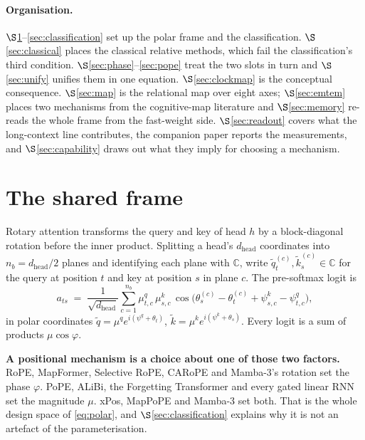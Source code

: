 \documentclass[11pt]{article}
\newcommand{\C}{\mathbb{C}}
\newcommand{\hd}{d_{\mathrm{head}}}
\newcommand{\nb}{n_b}
\begin{document}
\paragraph{Organisation.} $\S$\ref{sec:frame}--\ref{sec:classification} set up the
polar frame and the classification. $\S$\ref{sec:classical} places the classical
relative methods, which fail the classification's third condition.
$\S$\ref{sec:phase}--\ref{sec:pope} treat the two slots in turn and
$\S$\ref{sec:unify} unifies them in one equation. $\S$\ref{sec:clockmap} is the
conceptual consequence. $\S$\ref{sec:map} is the relational map over eight axes;
$\S$\ref{sec:emtem} places two mechanisms from the cognitive-map literature and
$\S$\ref{sec:memory} re-reads the whole frame from the fast-weight side.
$\S$\ref{sec:readout} covers what the long-context line contributes,
the companion paper reports the measurements, and $\S$\ref{sec:capability} draws
out what they imply for choosing a mechanism.


\section{The shared frame}
\label{sec:frame}

Rotary attention transforms the query and key of head $h$ by a block-diagonal
rotation before the inner product. Splitting a head's $\hd$ coordinates into
$\nb = \hd/2$ planes and identifying each plane with $\C$, write
$\tilde q_t^{(c)}, \tilde k_s^{(c)} \in \C$ for the query at position $t$ and key at
position $s$ in plane $c$. The pre-softmax logit is
\begin{equation}
  \label{eq:polar}
  a_{ts} \;=\; \frac{1}{\sqrt{\hd}}\sum_{c=1}^{\nb}
    \mu^q_{t,c}\,\mu^k_{s,c}\,
    \cos\!\big(\theta^{(c)}_s - \theta^{(c)}_t + \psi^k_{s,c} - \psi^q_{t,c}\big),
\end{equation}
in polar coordinates $\tilde q = \mu^q e^{i(\psi^q + \theta_t)}$,
$\tilde k = \mu^k e^{i(\psi^k + \theta_s)}$. Every logit is a sum of products
$\mu\cos\varphi$.

\medskip
\noindent\textbf{A positional mechanism is a choice about one of those two
factors.} RoPE, MapFormer, Selective RoPE, CARoPE and Mamba-3's rotation set the
phase $\varphi$. PoPE, ALiBi, the Forgetting Transformer and every gated linear RNN
set the magnitude $\mu$. xPos, MapPoPE and Mamba-3 set both. That is the whole
design space of \eqref{eq:polar}, and $\S$\ref{sec:classification} explains why it
is not an artefact of the parameterisation.
\end{document}
